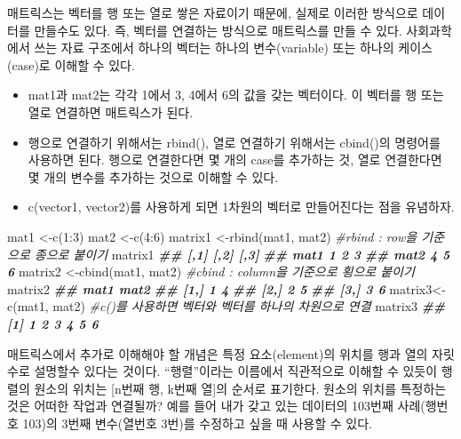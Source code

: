 \documentclass[
]{book}
\newenvironment{Shaded}{\begin{snugshade}}{\end{snugshade}}
\newcommand{\CommentTok}[1]{\textcolor[rgb]{0.56,0.35,0.01}{\textit{#1}}}
\newcommand{\DecValTok}[1]{\textcolor[rgb]{0.00,0.00,0.81}{#1}}
\newcommand{\DocumentationTok}[1]{\textcolor[rgb]{0.56,0.35,0.01}{\textbf{\textit{#1}}}}
\newcommand{\FunctionTok}[1]{\textcolor[rgb]{0.00,0.00,0.00}{#1}}
\newcommand{\NormalTok}[1]{#1}
\newcommand{\OtherTok}[1]{\textcolor[rgb]{0.56,0.35,0.01}{#1}}
\newcommand{\SpecialCharTok}[1]{\textcolor[rgb]{0.00,0.00,0.00}{#1}}
\providecommand{\tightlist}{%
  \setlength{\itemsep}{0pt}\setlength{\parskip}{0pt}}
\theoremstyle{definition}
\theoremstyle{definition}
\theoremstyle{definition}
\theoremstyle{definition}
\theoremstyle{remark}
\begin{document}
매트릭스는 벡터를 행 또는 열로 쌓은 자료이기 때문에, 실제로 이러한 방식으로 데이터를 만들수도 있다. 즉, 벡터를 연결하는 방식으로 매트릭스를 만들 수 있다. 사회과학에서 쓰는 자료 구조에서 하나의 벡터는 하나의 변수(variable) 또는 하나의 케이스(case)로 이해할 수 있다.

\begin{itemize}
\tightlist
\item
  mat1과 mat2는 각각 1에서 3, 4에서 6의 값을 갖는 벡터이다. 이 벡터를 행 또는 열로 연결하면 매트릭스가 된다.
\item
  행으로 연결하기 위해서는 rbind(), 열로 연결하기 위해서는 cbind()의 명령어를 사용하면 된다. 행으로 연결한다면 몇 개의 case를 추가하는 것, 열로 연결한다면 몇 개의 변수를 추가하는 것으로 이해할 수 있다.
\item
  c(vector1, vector2)를 사용하게 되면 1차원의 벡터로 만들어진다는 점을 유념하자.
\end{itemize}

\begin{Shaded}
\begin{Highlighting}[]
\NormalTok{mat1 }\OtherTok{\textless{}{-}}\FunctionTok{c}\NormalTok{(}\DecValTok{1}\SpecialCharTok{:}\DecValTok{3}\NormalTok{)}
\NormalTok{mat2 }\OtherTok{\textless{}{-}}\FunctionTok{c}\NormalTok{(}\DecValTok{4}\SpecialCharTok{:}\DecValTok{6}\NormalTok{)}
\NormalTok{matrix1 }\OtherTok{\textless{}{-}}\FunctionTok{rbind}\NormalTok{(mat1, mat2)  }\CommentTok{\#rbind : row을 기준으로 종으로 붙이기}
\NormalTok{matrix1}
\DocumentationTok{\#\#      [,1] [,2] [,3]}
\DocumentationTok{\#\# mat1    1    2    3}
\DocumentationTok{\#\# mat2    4    5    6}
\NormalTok{matrix2 }\OtherTok{\textless{}{-}}\FunctionTok{cbind}\NormalTok{(mat1, mat2)  }\CommentTok{\#cbind : column을 기준으로 횡으로 붙이기}
\NormalTok{matrix2}
\DocumentationTok{\#\#      mat1 mat2}
\DocumentationTok{\#\# [1,]    1    4}
\DocumentationTok{\#\# [2,]    2    5}
\DocumentationTok{\#\# [3,]    3    6}
\NormalTok{matrix3}\OtherTok{\textless{}{-}}\FunctionTok{c}\NormalTok{(mat1, mat2) }\CommentTok{\#c()를 사용하면 벡터와 벡터를 하나의 차원으로 연결}
\NormalTok{matrix3}
\DocumentationTok{\#\# [1] 1 2 3 4 5 6}
\end{Highlighting}
\end{Shaded}

매트릭스에서 추가로 이해해야 할 개념은 특정 요소(element)의 위치를 행과 열의 자릿수로 설명할수 있다는 것이다. ``행렬''이라는 이름에서 직관적으로 이해할 수 있듯이 행렬의 원소의 위치는 {[}n번째 행, k번째 열{]}의 순서로 표기한다. 원소의 위치를 특정하는 것은 어떠한 작업과 연결될까? 예를 들어 내가 갖고 있는 데이터의 103번째 사례(행번호 103)의 3번째 변수(열번호 3번)를 수정하고 싶을 때 사용할 수 있다.
\end{document}
